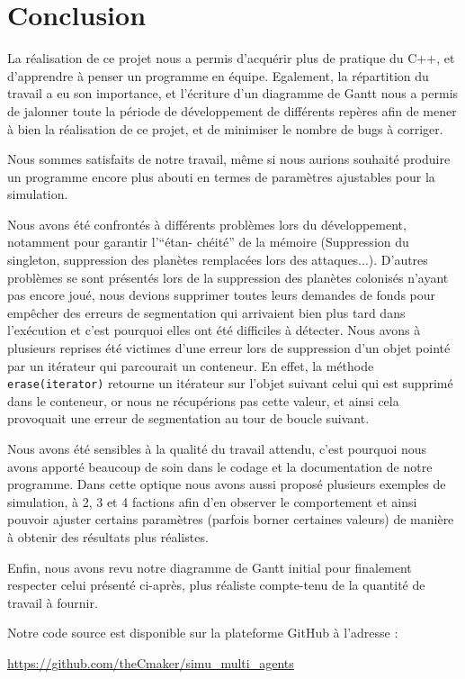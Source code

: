 \chapter{Conclusion}

    La réalisation de ce projet nous a permis d'acquérir plus de pratique du C++, et d'apprendre à penser un programme en équipe. Egalement, la répartition du travail a eu son importance, et l'écriture d'un diagramme de Gantt nous a permis de jalonner toute la période de développement de différents repères afin de mener à bien la réalisation de ce projet, et de minimiser le nombre de bugs à corriger.

    Nous sommes satisfaits de notre travail, même si nous aurions souhaité produire un programme encore plus abouti en termes de paramètres ajustables pour la simulation.

    Nous avons été confrontés à différents problèmes lors du développement, notamment pour garantir l'``étan- chéité'' de la mémoire (Suppression du singleton, suppression des planètes remplacées lors des attaques...). D'autres problèmes se sont présentés lors de la suppression des planètes colonisés n'ayant pas encore joué, nous devions supprimer toutes leurs demandes de fonds pour empêcher des erreurs de segmentation qui arrivaient bien plus tard dans l'exécution et c'est pourquoi elles ont été difficiles à détecter. 
    Nous avons à plusieurs reprises été victimes d’une erreur lors de suppression d’un objet pointé par un itérateur qui parcourait un conteneur. En effet, la méthode \texttt{erase(iterator)} retourne un itérateur sur l’objet suivant celui qui est supprimé dans le conteneur, or nous ne récupérions pas cette valeur, et ainsi cela provoquait une erreur de segmentation au tour de boucle suivant.

    Nous avons été sensibles à la qualité du travail attendu, c’est pourquoi nous avons apporté beaucoup de soin dans le codage et la documentation de notre programme. Dans cette optique nous avons aussi proposé plusieurs exemples de simulation, à 2, 3 et 4 factions afin d’en observer le comportement et ainsi pouvoir ajuster certains paramètres (parfois borner certaines valeurs) de manière à obtenir des résultats plus réalistes.
    
    Enfin, nous avons revu notre diagramme de Gantt initial pour finalement respecter celui présenté ci-après, plus réaliste compte-tenu de la quantité de travail à fournir.

    \begin{center}
        
    \end{center}

    \vfill 
    Notre code source est disponible sur la plateforme GitHub à l'adresse :
    \begin{center}
      \href{https://github.com/theCmaker/simu\_multi\_agents}{https://github.com/theCmaker/simu\_multi\_agents}
    \end{center}
    \vfill \null